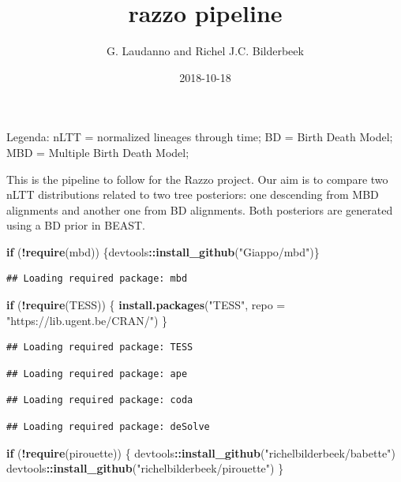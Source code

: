 \documentclass[]{article}
\title{razzo pipeline}
\author{G. Laudanno and Richel J.C. Bilderbeek}
\date{2018-10-18}
\newenvironment{Shaded}{\begin{snugshade}}{\end{snugshade}}
\newcommand{\KeywordTok}[1]{\textcolor[rgb]{0.13,0.29,0.53}{\textbf{#1}}}
\newcommand{\DataTypeTok}[1]{\textcolor[rgb]{0.13,0.29,0.53}{#1}}
\newcommand{\StringTok}[1]{\textcolor[rgb]{0.31,0.60,0.02}{#1}}
\newcommand{\ControlFlowTok}[1]{\textcolor[rgb]{0.13,0.29,0.53}{\textbf{#1}}}
\newcommand{\OperatorTok}[1]{\textcolor[rgb]{0.81,0.36,0.00}{\textbf{#1}}}
\newcommand{\NormalTok}[1]{#1}
\begin{document}
\maketitle

Legenda: nLTT = normalized lineages through time; BD = Birth Death
Model; MBD = Multiple Birth Death Model;

This is the pipeline to follow for the Razzo project. Our aim is to
compare two nLTT distributions related to two tree posteriors: one
descending from MBD alignments and another one from BD alignments. Both
posteriors are generated using a BD prior in BEAST.

\begin{Shaded}
\begin{Highlighting}[]
\ControlFlowTok{if}\NormalTok{ (}\OperatorTok{!}\KeywordTok{require}\NormalTok{(mbd)) \{devtools}\OperatorTok{::}\KeywordTok{install_github}\NormalTok{(}\StringTok{"Giappo/mbd"}\NormalTok{)\}}
\end{Highlighting}
\end{Shaded}

\begin{verbatim}
## Loading required package: mbd
\end{verbatim}

\begin{Shaded}
\begin{Highlighting}[]
\ControlFlowTok{if}\NormalTok{ (}\OperatorTok{!}\KeywordTok{require}\NormalTok{(TESS)) \{}
  \KeywordTok{install.packages}\NormalTok{(}\StringTok{"TESS"}\NormalTok{, }\DataTypeTok{repo =} \StringTok{"https://lib.ugent.be/CRAN/"}\NormalTok{)}
\NormalTok{\}}
\end{Highlighting}
\end{Shaded}

\begin{verbatim}
## Loading required package: TESS
\end{verbatim}

\begin{verbatim}
## Loading required package: ape
\end{verbatim}

\begin{verbatim}
## Loading required package: coda
\end{verbatim}

\begin{verbatim}
## Loading required package: deSolve
\end{verbatim}

\begin{Shaded}
\begin{Highlighting}[]
\ControlFlowTok{if}\NormalTok{ (}\OperatorTok{!}\KeywordTok{require}\NormalTok{(pirouette)) \{}
\NormalTok{  devtools}\OperatorTok{::}\KeywordTok{install_github}\NormalTok{(}\StringTok{"richelbilderbeek/babette"}\NormalTok{)}
\NormalTok{  devtools}\OperatorTok{::}\KeywordTok{install_github}\NormalTok{(}\StringTok{"richelbilderbeek/pirouette"}\NormalTok{)}
\NormalTok{\}}
\end{Highlighting}
\end{Shaded}
\end{document}
